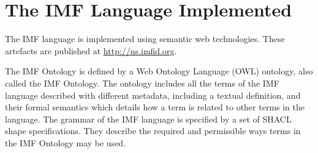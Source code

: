 \documentclass[../main.tex]{subfiles}
\begin{document}
\chapter{The IMF Language Implemented}
\label{ch:The IMF Language Formalized}

The IMF language is implemented using semantic web technologies. These artefacts are published at \url{http://ns.imfid.org}.

The IMF Ontology is defined by a Web Ontology Language (OWL) ontology, also called the IMF Ontology.
The ontology includes all the terms of the IMF language described with different metadata, including a textual definition, and their formal semantics which details how a term is related to other terms in the language. 
%
The grammar of the IMF language is specified by a set of SHACL shape specifications. They describe the required and permissible ways terms in the IMF Ontology may be used.
%




\label{ch:imf-ontology}

%
%
\end{document}
